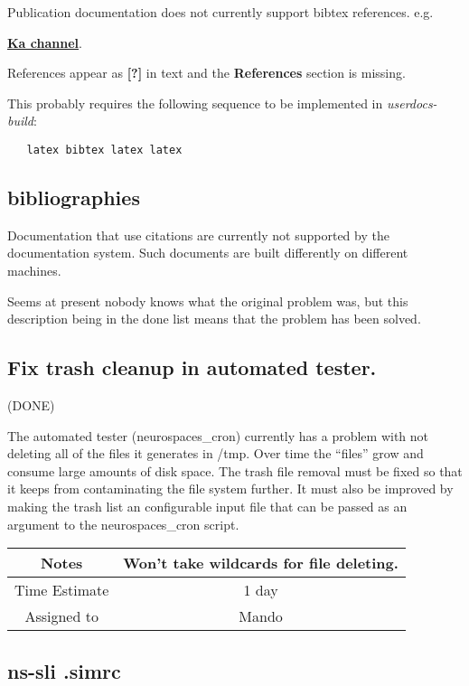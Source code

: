 \documentclass[12pt]{article}
\begin{document}
Publication documentation does not currently support bibtex references.
e.g.

\href{http://www.genesis-sim.org/userdocs/pub-purkinje-deschutter1-conductance1-ka1/pub-purkinje-deschutter1-conductance1-ka1.html}{\bf Ka channel}.

References appear as {\bf [?]} in text and the {\bf References} section is missing.

This probably requires the following sequence to be implemented in {\it userdocs-build}:
\begin{verbatim}
   latex bibtex latex latex
\end{verbatim}


\subsection{bibliographies}

Documentation that use citations are currently not supported by the
documentation system.  Such documents are built differently on
different machines.

Seems at present nobody knows what the original problem was, but this
description being in the done list means that the problem has been
solved.


\subsection{Fix trash cleanup in automated tester.} (DONE)

The automated tester (neurospaces\_cron) currently has a problem with
not deleting all of the files it generates in /tmp. Over time the
``files'' grow and consume large amounts of disk space. The trash file
removal must be fixed so that it keeps from contaminating the file
system further. It must also be improved by making the trash list an
configurable input file that can be passed as an argument to the
neurospaces\_cron script.

{
  \vspace{5mm}
  \centering
  \begin{tabular}{|c|c|}
    \hline
    Notes
    & Won't take wildcards for file deleting. \\
    \hline
    Time Estimate
    & 1 day \\
    \hline
    Assigned to
    & Mando \\
    \hline
  \end{tabular}
}


\subsection{ns-sli .simrc}
\end{document}

